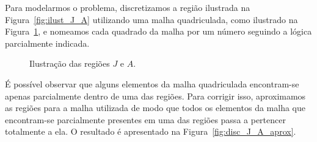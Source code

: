 Para modelarmos o problema, discretizamos a região ilustrada na
Figura~\ref{fig:ilust_J_A} utilizando uma malha quadriculada, como ilustrado na
Figura~\ref{fig:disc_J_A}, e nomeamos cada quadrado da malha por um número
seguindo a lógica parcialmente indicada.
\begin{figure}[!htb]
    \centering
    \caption{Ilustra\c{c}\~{a}o das regiões $J$ e $A$.}
    \label{fig:disc_J_A}
\end{figure}

É possível observar que alguns elementos da malha quadriculada encontram-se
apenas parcialmente dentro de uma das regiões. Para corrigir isso,
aproximamos as regiões para a malha utilizada de modo que todos os
elementos da malha que encontram-se parcialmente presentes em uma das regiões
passa a pertencer totalmente a ela. O resultado é apresentado na
Figura~\ref{fig:disc_J_A_aprox}.

